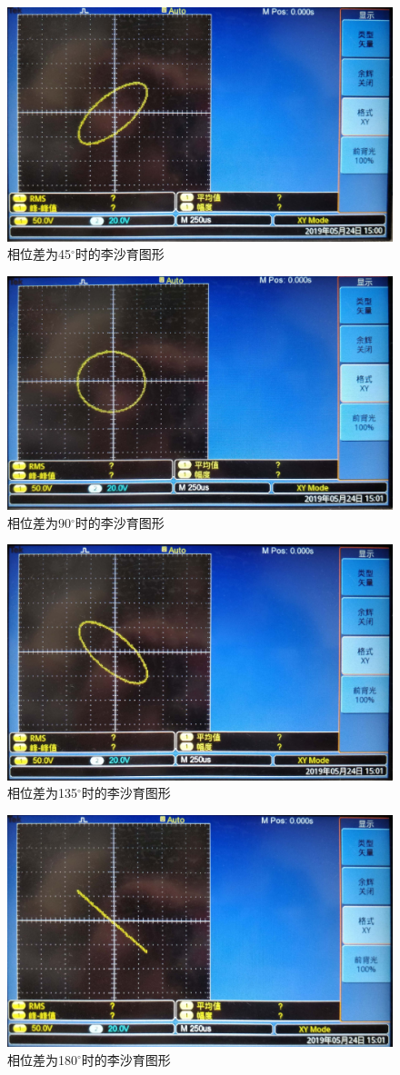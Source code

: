 \documentclass[12pt]{article}
\begin{document}
\begin{enumerate}
    \begin{figure}[htbp]
    \centering
    \includegraphics[width=.5\textwidth]{P003}
    \caption{相位差为45$^{\circ}$时的李沙育图形}\label{lsy45d}
  \end{figure}

    \begin{figure}[htbp]
    \centering
    \includegraphics[width=.5\textwidth]{P014}
    \caption{相位差为90$^{\circ}$时的李沙育图形}\label{lsy90d}
  \end{figure}

    \begin{figure}[htbp]
    \centering
    \includegraphics[width=.5\textwidth]{P008}
    \caption{相位差为135$^{\circ}$时的李沙育图形}\label{lsy135d}
  \end{figure}

    \begin{figure}[htbp]
    \centering
    \includegraphics[width=.5\textwidth]{P010}
    \caption{相位差为180$^{\circ}$时的李沙育图形}\label{lsy180d}
  \end{figure}
\end{enumerate}
\end{document}

